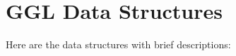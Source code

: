 \section{GGL Data Structures}
Here are the data structures with brief descriptions:\begin{CompactList}
\item{}
\end{CompactList}
